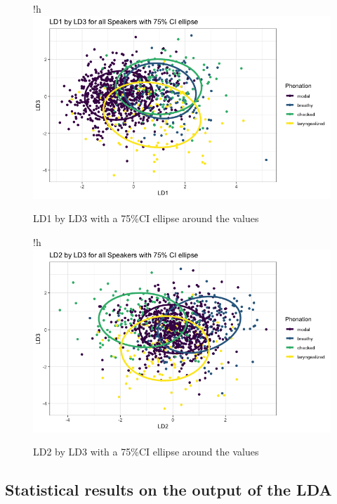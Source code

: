\documentclass[12pt, letterpaper]{article}
\begin{document}
\begin{figure}{!h}
		\centering
		\includegraphics[width=\linewidth]{Images/ld1xld3.png}
		\caption{LD1 by LD3 with a 75\%CI ellipse around the values}
		\label{fig:LD1LD3}
\end{figure}

\begin{figure}{!h}
		\centering
		\includegraphics[width=\linewidth]{Images/ld2xld3.png}
		\caption{LD2 by LD3 with a 75\%CI ellipse around the values}
		\label{fig:LD2LD3}
\end{figure}

\subsection{Statistical results on the output of the LDA} \label{sec:Stats}



\end{document}
